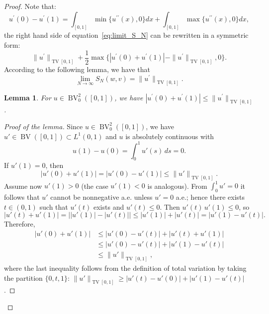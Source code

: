 \documentclass[12pt]{amsart}
\numberwithin{equation}{section}
\newtheorem{lemma}{Lemma}[section]
\theoremstyle{remark}
\begin{document}
\begin{proof}
Note that:
\begin{equation}
    u^\prime(0)- u^\prime(1) = \int_{[0,1]}\min\{u^{\prime\prime}(x), 0\}dx + \int_{[0,1]}\max\{u^{\prime\prime}(x), 0\}dx,
\end{equation}
the right hand side of equation~\eqref{eq:limit_S_N} can be rewritten in a symmetric form:
\begin{equation}
    \|u^\prime\|_{\operatorname{TV}[0,1]} + \frac{1}{2} \max\{|u^\prime(0)+u^\prime(1)| - \|u^\prime\|_{\operatorname{TV}[0,1]}, 0\}.
\end{equation}
According to the following lemma, we have that
\begin{equation}
    \lim_{N\to\infty} S_N(w,v) = \|u^\prime\|_{\operatorname{TV}[0,1]}.
\end{equation}
\begin{lemma}
For $u\in \operatorname{BV}^2_0([0,1])$, we have $|u^\prime(0)+u^\prime(1)| \le \|u^\prime\|_{\operatorname{TV}[0,1]}$.
\end{lemma}
\begin{proof}[Proof of the lemma]
Since $u\in \operatorname{BV}_0^2([0,1])$, we have $u'\in \operatorname{BV}([0,1])\subset L^1(0,1)$ and $u$ is absolutely continuous with
\begin{equation}
u(1)-u(0)=\int_0^1 u'(s)\,ds = 0 .
\end{equation}
If $u'(1)=0$, then
\begin{equation}
|u'(0)+u'(1)| = |u'(0)-u'(1)| \le \|u'\|_{\operatorname{TV}[0,1]} .
\end{equation}
Assume now $u'(1)>0$ (the case $u'(1)<0$ is analogous). From $\int_0^1 u'=0$ it follows that $u'$ cannot be nonnegative a.e.
unless $u'=0$ a.e.; hence there exists $t\in(0,1)$ such that $u'(t)$ exists and $u'(t)\le 0$. Then $u'(t)\,u'(1)\le 0$, so
\begin{equation}
|u'(t)+u'(1)| = \big||u'(1)|-|u'(t)|\big| \le |u'(1)|+|u'(t)| = |u'(1)-u'(t)|.
\end{equation}
Therefore,
\begin{equation}
\begin{aligned}
|u'(0)+u'(1)|
&\le |u'(0)-u'(t)| + |u'(t)+u'(1)| \\
&\le |u'(0)-u'(t)| + |u'(1)-u'(t)| \\
&\le \|u'\|_{\operatorname{TV}[0,1]},
\end{aligned}
\end{equation}
where the last inequality follows from the definition of total variation by taking the partition $\{0,t,1\}$:
$\|u'\|_{\operatorname{TV}[0,1]}\ge |u'(t)-u'(0)|+|u'(1)-u'(t)|$.
\end{proof}



\end{proof}
\end{document}
